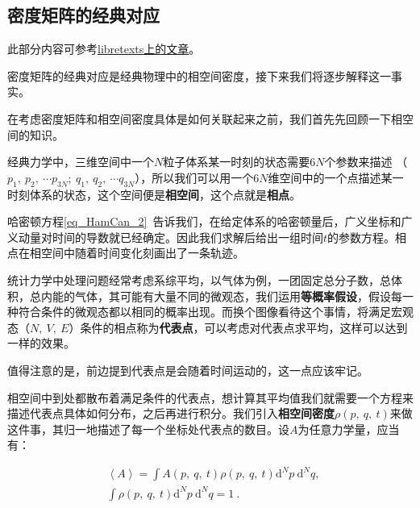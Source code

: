 \subsection{密度矩阵的经典对应}

此部分内容可参考\href{https://chem.libretexts.org/Bookshelves/Physical_and_Theoretical_Chemistry_Textbook_Maps/Supplemental_Modules_(Physical_and_Theoretical_Chemistry)/Statistical_Mechanics/Fundamentals_of_Statistical_Mechanics/09._Classical_and_quantum_dynamics_of_density_matrices}{libretexts上的文章}。

密度矩阵的经典对应是经典物理中的相空间密度，接下来我们将逐步解释这一事实。

在考虑密度矩阵和相空间密度具体是如何关联起来之前，我们首先先回顾一下相空间的知识。

经典力学中，三维空间中一个$N$粒子体系某一时刻的状态需要$6N$个参数来描述 （$p_1,~p_2,~\cdots p_{3N};~q_1,~q_2,~\cdots q_{3N}$），所以我们可以用一个$6N$维空间中的一个点描述某一时刻体系的状态，这个空间便是\textbf{相空间}，这个点就是\textbf{相点}。

哈密顿方程\autoref{eq_HamCan_2}~告诉我们，在给定体系的哈密顿量后，广义坐标和广义动量对时间的导数就已经确定。因此我们求解后给出一组时间$t$的参数方程。相点在相空间中随着时间变化刻画出了一条轨迹。

统计力学中处理问题经常考虑系综平均，以气体为例，一团固定总分子数，总体积，总内能的气体，其可能有大量不同的微观态，我们运用\textbf{等概率假设}，假设每一种符合条件的微观态都以相同的概率出现。而换个图像看待这个事情，将满足宏观态（$N,~V,~E$）条件的相点称为\textbf{代表点}，可以考虑对代表点求平均，这样可以达到一样的效果。

值得注意的是，前边提到代表点是会随着时间运动的，这一点应该牢记。

相空间中到处都散布着满足条件的代表点，想计算其平均值我们就需要一个方程来描述代表点具体如何分布，之后再进行积分。我们引入\textbf{相空间密度}$\rho\left(p,~q,~t\right)$来做这件事，其归一地描述了每一个坐标处代表点的数目。设$A$为任意力学量，应当有：

\begin{equation}\label{eq_denMat_7}
\begin{aligned}
&\left\langle A \right\rangle = \int A \left(p,~q,~t\right)\rho\left(p,~q,~t \right) \mathrm{d}^Np~\mathrm{d}^Nq ,\\
&\int \rho\left(p,~q,~t \right) \mathrm{d}^Np~\mathrm{d}^Nq = 1~.
\end{aligned}~
\end{equation}

